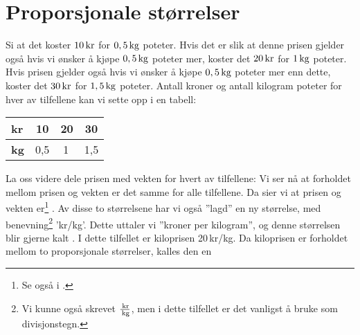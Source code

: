  \regv
{} 
\section{Proporsjonale størrelser \label{Propstorl}}
Si at det koster $ 10\,\textrm{kr}$ for $ 0,5\,\textrm{kg} $ poteter. Hvis det er slik at denne prisen gjelder også hvis vi ønsker å kjøpe $ 0,5\,\textrm{kg} $ poteter mer, koster det $ 20\,\textrm{kr} $ for $ 1\,\textrm{kg} $ poteter. Hvis prisen gjelder også hvis vi ønsker å kjøpe $ 0,5\,\textrm{kg} $ poteter mer enn dette, koster det $ 30\,\textrm{kr} $ for $ 1,5\,\textrm{kg} $ poteter. Antall kroner og antall kilogram poteter for hver av tilfellene kan vi sette opp i en tabell: \vs
\begin{center}
	\begin{tabular}{|l|c|c|c|}
		\hline
\textbf{kr} & 10  & 20 & 30 \\ \hline
\textbf{kg} & 0,5 & 1\,& 1,5 \\ \hline
	\end{tabular}
\end{center}
La oss videre dele prisen med vekten for hvert av tilfellene:
Vi ser nå at forholdet mellom prisen og vekten er det samme for alle tilfellene. Da sier vi at prisen og vekten er\footnote{Se også  i \mb.} . Av disse to størrelsene har vi også ''lagd'' en ny størrelse, med benevning\footnote{Vi kunne også skrevet $ \frac{\,\textrm{kr}}{\,\textrm{kg}} $, men i dette tilfellet er det vanligst å bruke \sym{/} som divisjonstegn.} 'kr/kg'. Dette uttaler vi ''kroner per kilogram'', og denne størrelsen blir gjerne kalt . I dette tilfellet er kiloprisen 20\,kr/kg. Da kiloprisen er forholdet mellom to proporsjonale størrelser, kalles den en  \regv
{} \regv

